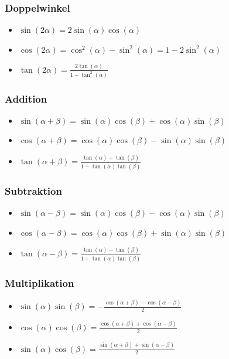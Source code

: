 \documentclass[a4paper,10pt]{article}
\begin{document}
\subsubsection{Doppelwinkel}
\begin{itemize}
 \item $\sin(2\alpha) = 2 \sin(\alpha) \cos(\alpha)$
 \item $\cos(2\alpha) = \cos^2(\alpha) - \sin^2(\alpha) = 1 - 2 \sin^2(\alpha)$
 \item $\tan(2\alpha) = \frac{2\tan(\alpha)}{1 - \tan^2(\alpha)}$
\end{itemize}

\subsubsection{Addition}
\begin{itemize}
 \item $\sin(\alpha + \beta) = \sin(\alpha) \cos(\beta) + \cos(\alpha) \sin(\beta)$
 \item $\cos(\alpha + \beta) = \cos(\alpha) \cos(\beta) - \sin(\alpha) \sin(\beta)$
 \item $\tan(\alpha + \beta) = \frac{\tan(\alpha) + \tan(\beta)}{1 - \tan(\alpha) \tan(\beta)}$
\end{itemize}

\subsubsection{Subtraktion}
\begin{itemize}
 \item $\sin(\alpha - \beta) = \sin(\alpha) \cos(\beta) - \cos(\alpha)\sin(\beta)$
 \item $\cos(\alpha - \beta) = \cos(\alpha) \cos(\beta) + \sin(\alpha)\sin(\beta)$
 \item $\tan(\alpha - \beta) = \frac{\tan(\alpha) - \tan(\beta)}{1+\tan(\alpha) \tan(\beta)}$
\end{itemize}

\subsubsection{Multiplikation}
\begin{itemize}
 \item $\sin(\alpha) \sin(\beta) = -\frac{\cos(\alpha + \beta) - \cos(\alpha - \beta)}{2}$
 \item $\cos(\alpha) \cos(\beta) =  \frac{\cos(\alpha + \beta) + \cos(\alpha - \beta)}{2}$
 \item $\sin(\alpha) \cos(\beta) =  \frac{\sin(\alpha + \beta) + \sin(\alpha - \beta)}{2}$
\end{itemize}
\end{document}
